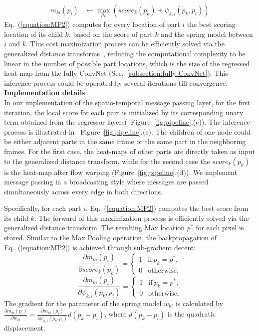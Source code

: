 \documentclass[10pt,twocolumn,letterpaper]{article}
\newcommand{\figref}[1]{Figure~\ref{#1}}
\newcommand{\secref}[1]{Sec.~\ref{#1}}
\newcommand{\refequ}[1]{Eq.~(\ref{#1})}
\begin{document}
\begin{equation}
\begin{aligned}
m_{ki}(p_i) &\leftarrow \max_{p_k}(score_k(p_k)+\psi_{k,i}(p_k, p_i))
\end{aligned}
\label{equation:MP2}
\end{equation}\refequ{equation:MP2} computes for every location of part $i$ the best scoring location of its child $k$, based on the score of part $k$ and the spring model between $i$ and $k$. This cost maximization process can be efficiently solved via the generalized distance transforms~\cite{felzenszwalb2004distance}, reducing the computational complexity to be linear in the number of possible part locations, which is the size of the regressed heat-map from the fully ConvNet (\secref{subsection:fully ConvNet}). This inference process could be operated by several iterations till convergence. \\

\noindent\textbf{Implementation details}\\
In our implementation of the spatio-temporal message passing layer, for the first iteration, the local score for each part is initialized by its corresponding unary term obtained from the regressor layers(~\figref{fig:pipeline},(c)). The inference process is illustrated in ~\figref{fig:pipeline},(e). The children of one node could be either adjacent parts in the same frame or the same part in the neighboring frames. For the first case, the heat-maps of other parts are directly taken as input to the generalized distance transform, while for the second case the $score_k(p_k)$ is the heat-map after flow warping (\figref{fig:pipeline},(d)).
We implement message passing in a broadcasting style where messages are passed simultaneously across every edge in both directions.

Specifically, for each part $i$, \refequ{equation:MP2} computes the best score from its child $k$. The forward of this maximization process is efficiently solved via the generalized distance transform. The resulting Max location $p^*$ for each pixel is stored. Similar to the Max Pooling operation, the backpropagation of \refequ{equation:MP2} is achieved through sub-gradient decent: 
\begin{displaymath}
\frac{\partial m_{ki}(p_i)}{\partial score_k(p_k)} = \left\{ \begin{array}{cc}
1 & \mathrm{if} \ p_k = p^*, \\
0 & \mathrm{otherwise}.
\end{array}
\right.
\end{displaymath}\begin{displaymath}
\frac{\partial m_{ki}(p_i)}{\partial \psi_{k,i}(p_k, p_i)} = \left\{ \begin{array}{cc}
1 & \mathrm{if} \ p_k = p^*, \\
0 & \mathrm{otherwise}.
\end{array}
\right.
\end{displaymath}
The gradient for the parameter of the spring model $w_{ki}$ is calculated by $\frac{\partial m_{ki}(p_i)}{\partial w_{ki}} = \frac{\partial m_{ki}(p_i)}{\partial \psi_{k,i}(p_k, p_i)}d(p_k-p_i)$, where $d(p_k-p_i)$ is the quadratic displacement. 
\end{document}
